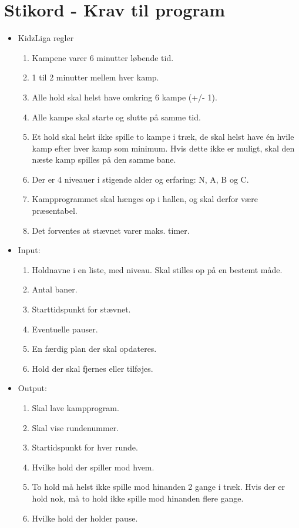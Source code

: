 \section*{Stikord - Krav til program}
\begin{itemize}
    \item KidzLiga regler
    \begin{enumerate}
        \item Kampene varer 6 minutter løbende tid.
        \item 1 til 2 minutter mellem hver kamp.
        \item Alle hold skal helst have omkring 6 kampe (+/- 1).
        \item Alle kampe skal starte og slutte på samme tid. 
        \item Et hold skal helst ikke spille to kampe i træk, de skal helst have én hvile kamp efter hver kamp som minimum. Hvis dette ikke er muligt, skal den næste kamp spilles på den samme bane.
        \item Der er 4 niveauer i stigende alder og erfaring: N, A, B og C.
        \item Kampprogrammet skal hænges op i hallen, og skal derfor være præsentabel.
        \item Det forventes at stævnet varer maks. timer.
    \end{enumerate}
    
    \item Input:
    \begin{enumerate}
        \item Holdnavne i en liste, med niveau. Skal stilles op på en bestemt måde.
        \item Antal baner.
        \item Starttidspunkt for stævnet.
        \item Eventuelle pauser.
        \item En færdig plan der skal opdateres.
        \item Hold der skal fjernes eller tilføjes.
    \end{enumerate}
    
    \item Output:
    \begin{enumerate}
        \item Skal lave kampprogram.
        \item Skal vise rundenummer.
        \item Startidspunkt for hver runde.
        \item Hvilke hold der spiller mod hvem.
        \item To hold må helst ikke spille mod hinanden 2 gange i træk. Hvis der er hold nok, må to hold ikke spille mod hinanden flere gange.
        \item Hvilke hold der holder pause.
    \end{enumerate}
    

\end{itemize}
